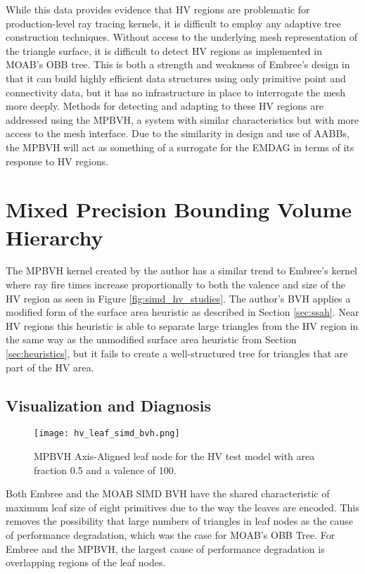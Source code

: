 While this data provides evidence that HV regions are problematic for
production-level ray tracing kernels, it is difficult to employ any adaptive
tree construction techniques. Without access to the underlying mesh
representation of the triangle surface, it is difficult to detect HV regions as
implemented in MOAB's OBB tree. This is both a strength and weakness of Embree's
design in that it can build highly efficient data structures using only
primitive point and connectivity data, but it has no infrastructure in place to
interrogate the mesh more deeply. Methods for detecting and adapting to these HV
regions are addressed using the MPBVH, a system with similar characteristics
but with more access to the mesh interface. Due to the similarity in design and
use of AABBs, the MPBVH will act as something of a surrogate for the EMDAG in
terms of its response to HV regions.

\section{Mixed Precision Bounding Volume Hierarchy}\label{sec:simd_hv_study}

The MPBVH kernel created by the author has a similar trend to Embree's kernel
where ray fire times increase proportionally to both the valence and size of the
HV region as seen in Figure \ref{fig:simd_hv_studies}. The author's BVH applies
a modified form of the surface area heuristic as described in Section
\ref{sec:ssah}. Near HV regions this heuristic is able to separate large
triangles from the HV region in the same way as the unmodified surface area
heuristic from Section \ref{sec:heuristics}, but it fails to create a
well-structured tree for triangles that are part of the HV area.

\subsection{Visualization and Diagnosis}

\begin{figure}
  \centering
  \texttt{[image: hv\_leaf\_simd\_bvh.png]}
  \caption[Axis-aligned bounding box in the high valence region.]{MPBVH
    Axis-Aligned leaf node for the HV test model with area fraction 0.5 and a
    valence of 100.}
  \label{fig:hv_leaf_simd_bvh}
\end{figure}
  
Both Embree and the MOAB SIMD BVH have the shared characteristic of maximum leaf
size of eight primitives due to the way the leaves are encoded. This removes the
possibility that large numbers of triangles in leaf nodes as the cause of
performance degradation, which was the case for MOAB's OBB Tree. For Embree and
the MPBVH, the largest cause of performance degradation is overlapping regions
of the leaf nodes.

